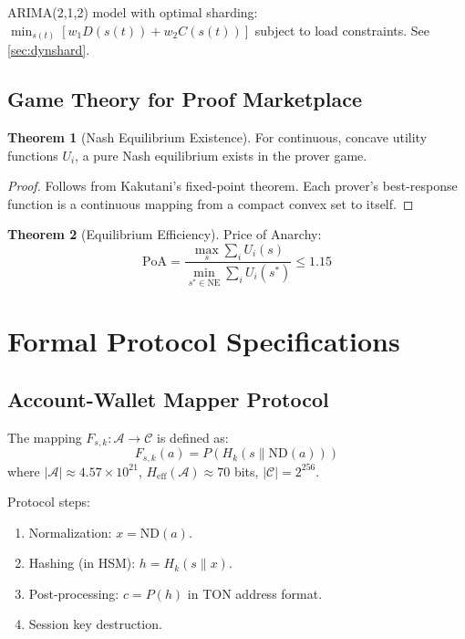 \documentclass[12pt,a4paper]{article}
\theoremstyle{definition}
\newtheorem{theorem}{Theorem}[section]
\theoremstyle{remark}
\begin{document}
ARIMA(2,1,2) model with optimal sharding: $\min_{s(t)} [w_1 D(s(t)) + w_2 C(s(t))]$ subject to load constraints. See \cref{sec:dynshard}.

\subsection{Game Theory for Proof Marketplace}

\begin{theorem}[Nash Equilibrium Existence]
\label{thm:nash-existence}
For continuous, concave utility functions $U_i$, a pure Nash equilibrium exists in the prover game.
\end{theorem}

\begin{proof}
Follows from Kakutani's fixed-point theorem. Each prover's best-response function is a continuous mapping from a compact convex set to itself.
\end{proof}

\begin{theorem}[Equilibrium Efficiency]
\label{thm:poa}
Price of Anarchy:
\begin{equation}
\text{PoA} = \frac{\max_s \sum_i U_i(s)}{\min_{s^* \in \text{NE}} \sum_i U_i(s^*)} \leq 1.15
\end{equation}
\end{theorem}


\section{Formal Protocol Specifications}
\label{app:protocols}

\subsection{Account-Wallet Mapper Protocol}
\label{app:mapper-protocol}

The mapping $F_{s,k}: \mathcal{A} \to \mathcal{C}$ is defined as:
\begin{equation}
F_{s,k}(a) = P(H_k(s \| \text{ND}(a)))
\end{equation}
where $|\mathcal{A}| \approx 4.57 \times 10^{21}$, $H_{\text{eff}}(\mathcal{A}) \approx 70$ bits, $|\mathcal{C}| = 2^{256}$.

Protocol steps:
\begin{enumerate}[nosep]
    \item Normalization: $x = \text{ND}(a)$.
    \item Hashing (in HSM): $h = H_k(s \| x)$.
    \item Post-processing: $c = P(h)$ in TON address format.
    \item Session key destruction.
\end{enumerate}
\end{document}
